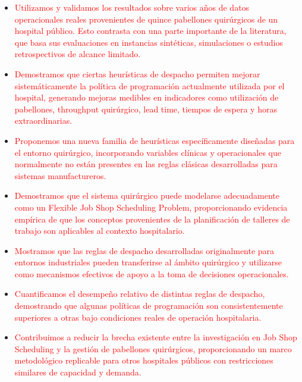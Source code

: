 \documentclass[sn-mathphys-num]{sn-jnl}
\begin{document}
\begin{itemize}

\item \textcolor{red}{
Utilizamos y validamos los resultados sobre varios años de datos operacionales reales provenientes de quince pabellones quirúrgicos de un hospital público. Esto contrasta con una parte importante de la literatura, que basa sus evaluaciones en instancias sintéticas, simulaciones o estudios retrospectivos de alcance limitado.
}

\item \textcolor{red}{
Demostramos que ciertas heurísticas de despacho permiten mejorar sistemáticamente la política de programación actualmente utilizada por el hospital, generando mejoras medibles en indicadores como utilización de pabellones, throughput quirúrgico, lead time, tiempos de espera y horas extraordinarias.
}

\item \textcolor{red}{
Proponemos una nueva familia de heurísticas específicamente diseñadas para el entorno quirúrgico, incorporando variables clínicas y operacionales que normalmente no están presentes en las reglas clásicas desarrolladas para sistemas manufactureros.
}

\item \textcolor{red}{
Demostramos que el sistema quirúrgico puede modelarse adecuadamente como un Flexible Job Shop Scheduling Problem, proporcionando evidencia empírica de que los conceptos provenientes de la planificación de talleres de trabajo son aplicables al contexto hospitalario.
}

\item \textcolor{red}{
Mostramos que las reglas de despacho desarrolladas originalmente para entornos industriales pueden transferirse al ámbito quirúrgico y utilizarse como mecanismos efectivos de apoyo a la toma de decisiones operacionales.
}

\item \textcolor{red}{
Cuantificamos el desempeño relativo de distintas reglas de despacho, demostrando que algunas políticas de programación son consistentemente superiores a otras bajo condiciones reales de operación hospitalaria.
}

\item \textcolor{red}{
Contribuimos a reducir la brecha existente entre la investigación en Job Shop Scheduling y la gestión de pabellones quirúrgicos, proporcionando un marco metodológico replicable para otros hospitales públicos con restricciones similares de capacidad y demanda.
}

\end{itemize}
\end{document}
